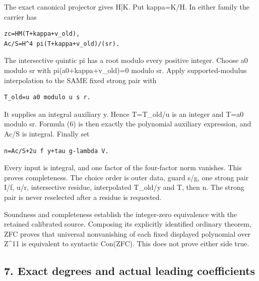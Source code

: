 The exact canonical projector gives H|K. Put kappa=\allowbreak{}K/\allowbreak{}H. In either family the carrier has



\begin{verbatim}
zc=HM(T+kappa+v_old),
Ac/S=H^4 pi(T+kappa+v_old)/(sr).
\end{verbatim}

The intersective quintic pi has a root modulo every positive integer. Choose a0 modulo sr with pi(a0+\allowbreak{}kappa+\allowbreak{}v\_\allowbreak{}old)=\allowbreak{}0 modulo sr. Apply supported-modulus interpolation to the SAME fixed strong pair with



\begin{verbatim}
T_old=u a0 modulo u s r.
\end{verbatim}

It supplies an integral auxiliary y. Hence T=\allowbreak{}T\_\allowbreak{}old/\allowbreak{}u is an integer and T=\allowbreak{}a0 modulo sr. Formula (6) is then exactly the polynomial auxiliary expression, and Ac/\allowbreak{}S is integral. Finally set



\begin{verbatim}
n=Ac/S+2u f y+tau g-lambda V.
\end{verbatim}

Every input is integral, and one factor of the four-factor norm vanishes. This proves completeness. The choice order is outer data, guard s/\allowbreak{}g, one strong pair I/\allowbreak{}f, u/\allowbreak{}r, intersective residue, interpolated T\_\allowbreak{}old/\allowbreak{}y and T, then n. The strong pair is never reselected after a residue is requested.



Soundness and completeness establish the integer-zero equivalence with the retained calibrated source. Composing its explicitly identified ordinary theorem, ZFC proves that universal nonvanishing of each fixed displayed polynomial over Z\textasciicircum{}\allowbreak{}11 is equivalent to syntactic Con(ZFC). This does not prove either side true.



\subsection{7. Exact degrees and actual leading coefficients}




